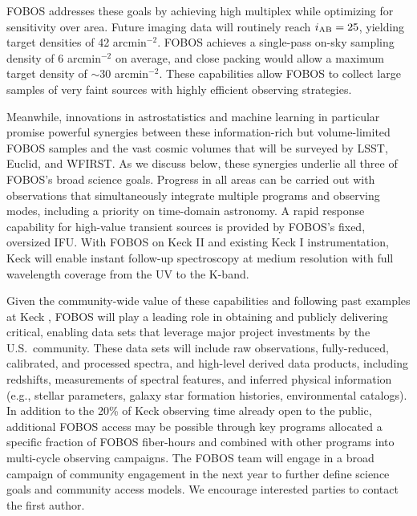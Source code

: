 FOBOS addresses these goals by achieving high multiplex while optimizing for sensitivity over area.  Future imaging
data will routinely reach $i_{\rm AB} = 25$, yielding target densities of 42 arcmin$^{-2}$.  FOBOS achieves a
single-pass on-sky sampling density of 6 arcmin$^{-2}$ on average, and close packing would allow a maximum target density of
$\sim$30 arcmin$^{-2}$.  These capabilities allow FOBOS to collect large samples of very faint sources with highly
efficient observing strategies.

Meanwhile, innovations in astrostatistics and machine learning in particular promise powerful synergies between these
information-rich but volume-limited FOBOS samples and the vast cosmic volumes that will be surveyed by LSST, Euclid,
and WFIRST.  As we discuss below, these synergies underlie all three of FOBOS's broad science goals.  Progress in all areas can be carried out with observations that simultaneously integrate multiple programs and observing modes, including a priority on time-domain astronomy.  A rapid response capability for high-value transient sources is provided by FOBOS's fixed, oversized IFU.  With FOBOS on Keck II and existing Keck I instrumentation, Keck will enable instant follow-up spectroscopy at medium resolution with full wavelength coverage from the UV to the K-band.  

Given the community-wide value of these capabilities  and
following past examples at Keck \citep[e.g., DEEP2][]{newman13}, FOBOS will play a leading role in obtaining and
publicly delivering critical, enabling data sets that leverage major project investments by the U.S.~community.  These
data sets will include raw observations, fully-reduced, calibrated, and processed spectra, and high-level derived data
products, including redshifts, measurements of spectral features, and inferred physical information (e.g., stellar
parameters, galaxy star formation histories, environmental catalogs).  In addition to the 20\% of Keck observing time
already open to the public, additional FOBOS access may be possible through key programs allocated a specific fraction
of FOBOS fiber-hours and combined with other programs into multi-cycle observing campaigns.  The FOBOS team will engage in a broad campaign of community engagement in the next year to further define science goals and community access models.  We encourage interested parties to contact the first author.


